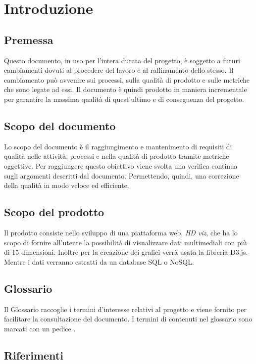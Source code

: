 \section{Introduzione}

    \subsection{Premessa}
    Questo documento, in uso per l'intera durata del progetto, è soggetto a futuri cambiamenti dovuti al procedere del lavoro e al raffinamento dello stesso. Il cambiamento può avvenire sui processi, sulla qualità di prodotto e sulle metriche che sono legate ad essi. Il documento è quindi prodotto in maniera incrementale per garantire la massima qualità di quest'ultimo e di conseguenza del progetto.
    
    \subsection{Scopo del documento}
    Lo scopo del documento è il raggiungimento e mantenimento di requisiti di qualità nelle attività, processi e nella qualità di prodotto tramite metriche oggettive. Per raggiungere questo obiettivo viene svolta una verifica continua sugli argomenti descritti dal documento. Permettendo, quindi, una correzione della qualità in modo veloce ed efficiente.
    
    \subsection{Scopo del prodotto}
    Il prodotto consiste nello sviluppo di una piattaforma web, \textit{HD viz}, che ha lo scopo di fornire all'utente la possibilità di visualizzare dati multimediali con più di 15 dimensioni. Inoltre per la creazione dei grafici verrà usata la libreria D3.js. Mentre i dati verranno estratti da un database SQL o NoSQL.
    
    \subsection{Glossario}
    Il Glossario raccoglie i termini d'interesse relativi al progetto e viene fornito per facilitare la consultazione del documento. I termini di contenuti nel glossario sono marcati con un pedice \glo{}.

    \subsection{Riferimenti}
